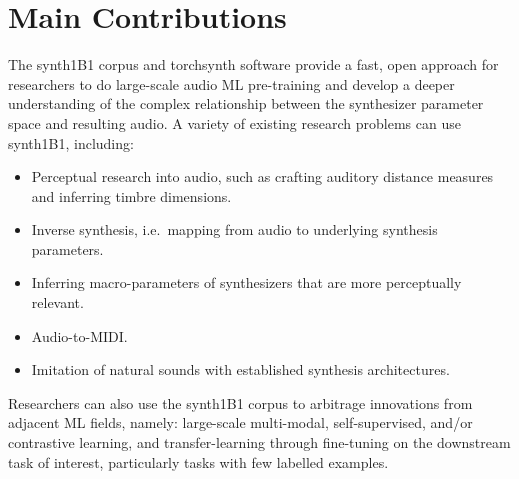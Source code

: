 

\section{Main Contributions}
\label{sec:contributions}

The synth1B1 corpus and torchsynth software provide a fast, open approach for researchers to do large-scale audio ML pre-training and develop a deeper understanding of the complex relationship between the synthesizer parameter space and resulting audio.
A variety of existing research problems can use synth1B1, including:
\begin{itemize}
\item Perceptual research into audio, such as crafting auditory distance measures and inferring timbre dimensions. \cite{vahidi2020timbre}
\item Inverse synthesis, i.e.\ mapping from audio to underlying synthesis parameters.
\cite{yee2018automatic,esling2020flow}
\item Inferring macro-parameters of synthesizers that are more perceptually relevant. \cite{esling2020flow, tatar2021latent}
\item Audio-to-MIDI. \cite{47659}
\item Imitation of natural sounds with established synthesis architectures.
\end{itemize}
Researchers can also use the synth1B1 corpus to arbitrage innovations from adjacent ML fields, namely: large-scale multi-modal, self-supervised, and/or contrastive learning, and transfer-learning through fine-tuning on the downstream task of interest, particularly tasks with few labelled examples.

